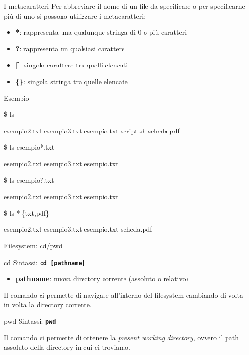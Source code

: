 \documentclass{beamer}
\begin{document}
    \begin{frame}{I metacaratteri}
        Per abbreviare il nome di un file da specificare o per specificarne più di uno
        si possono utilizzare i metacaratteri:
        \begin{itemize}
            \item \textbf{*}: rappresenta una qualunque stringa di 0 o più caratteri
            \item \textbf{?}: rappresenta un qualsiasi carattere
            \item \textbf{[]}: singolo carattere tra quelli elencati
            \item \textbf{\{\}}: singola stringa tra quelle elencate
        \end{itemize}
        \begin{exampleblock}{Esempio}
            \footnotesize

            \$ ls

            esempio2.txt esempio3.txt esempio.txt script.sh scheda.pdf

            \vspace{0.25cm}

            \$ ls esempio*.txt

            esempio2.txt esempio3.txt esempio.txt

            \vspace{0.25cm}

            \$ ls esempio?.txt

            esempio2.txt esempio3.txt esempio.txt

            \vspace{0.25cm}

            \$ ls *.\{txt,pdf\}

            esempio2.txt esempio3.txt esempio.txt scheda.pdf
        \end{exampleblock}
    \end{frame}

    \begin{frame}{Filesystem: cd/pwd}
        \begin{block}{cd}
            \small
            Sintassi: \texttt{\textbf{cd [pathname]}}
            
            \begin{itemize}
                \item \textbf{pathname}: nuova directory corrente (assoluto o relativo)
            \end{itemize}

            Il comando ci permette di navigare all'interno del
            filesystem cambiando di volta in volta la directory corrente.
        \end{block}

        \begin{block}{pwd}
            \small
            Sintassi: \texttt{\textbf{pwd}}

            Il comando ci permette di ottenere la \textit{present working directory}, ovvero il path assoluto
            della directory in cui ci troviamo.
        \end{block}
    \end{frame}
\end{document}

